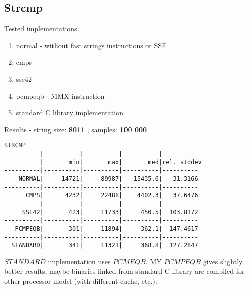 \documentclass[11pt,a4paper]{article}
\begin{document}
\subsection{Strcmp}\label{subsec:strcmp}
    Tested implementations:
    \begin{enumerate}
        \item normal - without fast strings instructions or SSE
        \item cmps
        \item sse42
        \item pcmpeqb - MMX instruction
        \item standard C library implementation
    \end{enumerate}
Results - string size: \textbf{8011} , samples: \textbf{100 000}
\begin{lstlisting}[]
STRCMP
__________|__________|__________|__________|__________
          |       min|       max|       med|rel. stddev
----------|----------|----------|----------|----------
    NORMAL|     14721|     89987|   15435.6|   31.3166
----------|----------|----------|----------|----------
      CMPS|      4232|     22488|    4402.3|   37.6476
----------|----------|----------|----------|----------
     SSE42|       423|     11733|     450.5|  103.8172
----------|----------|----------|----------|----------
   PCMPEQB|       301|     11894|     362.1|  147.4617
----------|----------|----------|----------|----------
  STANDARD|       341|     11321|     368.8|  127.2847
\end{lstlisting}
$STANDARD$ implementation uses $PCMEQB$.
MY $PCMPEQB$ gives slightly better results, maybe binaries linked from standard C library are compiled for other processor model (with different cache, etc.).
\end{document}
